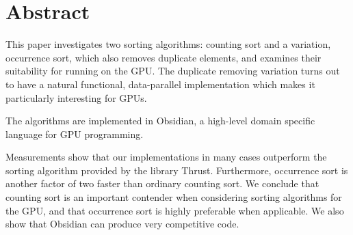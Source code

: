 \section*{Abstract}
This paper investigates two sorting algorithms: counting sort and a
variation, occurrence sort,  which also removes duplicate elements, 
and examines their suitability for running on the GPU. The duplicate 
removing variation
turns out to have a natural functional, data-parallel implementation
which makes it particularly interesting for GPUs.

The algorithms are implemented in Obsidian, a high-level domain
specific language for GPU programming.

Measurements show that our implementations in many cases outperform
the sorting algorithm provided by the library Thrust. Furthermore, occurrence
sort is another factor of two faster than
ordinary counting sort. We conclude that counting sort is an important
contender when considering sorting algorithms for the GPU, and that 
occurrence sort is highly preferable when applicable. We also show 
that Obsidian can produce very competitive code.











 




